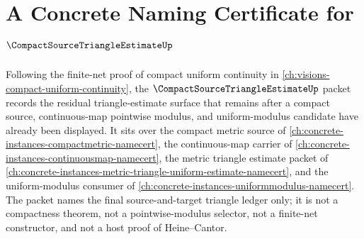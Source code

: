 \chapter{A Concrete Naming Certificate for $\CompactSourceTriangleEstimateUp$}
\label{ch:concrete-instances-compact-source-triangle-estimate-namecert}

Following the finite-net proof of compact uniform continuity in \autoref{ch:visions-compact-uniform-continuity}, the $\CompactSourceTriangleEstimateUp$ packet records the residual triangle-estimate surface that remains after a compact source, continuous-map pointwise modulus, and uniform-modulus candidate have already been displayed. It sits over the compact metric source of \autoref{ch:concrete-instances-compactmetric-namecert}, the continuous-map carrier of \autoref{ch:concrete-instances-continuousmap-namecert}, the metric triangle estimate packet of \autoref{ch:concrete-instances-metric-triangle-uniform-estimate-namecert}, and the uniform-modulus consumer of \autoref{ch:concrete-instances-uniformmodulus-namecert}. The packet names the final source-and-target triangle ledger only; it is not a compactness theorem, not a pointwise-modulus selector, not a finite-net constructor, and not a host proof of Heine--Cantor.

